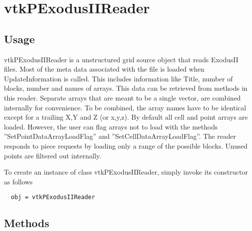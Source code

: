 \section{vtkPExodusIIReader}

\subsection{Usage}

 vtkPExodusIIReader is a unstructured grid source object that reads
 ExodusII files. Most of the meta data associated with the
 file is loaded when UpdateInformation is called. This includes
 information like Title, number of blocks, number and names of
 arrays. This data can be retrieved from methods in this
 reader. Separate arrays that are meant to be a single vector, are
 combined internally for convenience. To be combined, the array
 names have to be identical except for a trailing X,Y and Z (or
 x,y,z). By default all cell and point arrays are loaded. However,
 the user can flag arrays not to load with the methods
 ''SetPointDataArrayLoadFlag'' and ''SetCellDataArrayLoadFlag''. The
 reader responds to piece requests by loading only a range of the
 possible blocks. Unused points are filtered out internally.

To create an instance of class vtkPExodusIIReader, simply
invoke its constructor as follows
\begin{verbatim}
  obj = vtkPExodusIIReader
\end{verbatim}
\subsection{Methods}

